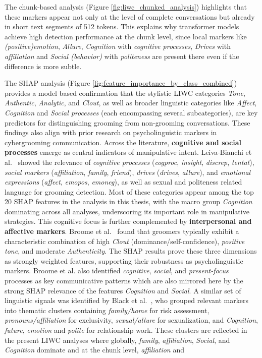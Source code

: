 The chunk-based analysis (Figure \ref{fig:liwc_chunked_analysis}) highlights that these markers appear not only at the level of complete conversations but already in short text segments of 512 tokens. This explains why transformer models achieve high detection performance at the chunk level, since local markers like \textit{(positive)emotion}, \textit{Allure}, \textit{Cognition} with \textit{cognitive processes}, \textit{Drives} with \textit{affiliation} and \textit{Social (behavior)} with \textit{politeness} are present there even if the difference is more subtle.


The SHAP analysis (Figure \ref{fig:feature_importance_by_class_combined}) provides a model based confirmation that the stylistic LIWC categories \textit{Tone}, \textit{Authentic}, \textit{Analytic}, and \textit{Clout}, as well as broader linguistic categories like  \textit{Affect}, \textit{Cognition} and \textit{Social processes} (each encompassing several subcategories), are key predictors for distinguishing grooming from non-grooming conversations. These findings also align with prior research on psycholinguistic markers in cybergrooming communication. Across the literature, \textbf{cognitive and social processes} emerge as central indicators of manipulative intent. Leiva-Bianchi et al.~\cite{leiva2024meta} showed the relevance of \textit{cognitive processes} (\textit{cogproc}, \textit{insight}, \textit{discrep}, \textit{tentat}), \textit{social markers} (\textit{affiliation}, \textit{family}, \textit{friend}), \textit{drives} (\textit{drives}, \textit{allure}), and \textit{emotional expressions} (\textit{affect}, \textit{emopos}, \textit{emoneg}), as well as sexual and politeness related language for grooming detection. Most of these categories appear among the top 20 SHAP features in the analysis in this thesis, with the macro group \textit{Cognition} dominating across all analyses, underscoring its important role in manipulative strategies. This cognitive focus is further complemented by \textbf{interpersonal and affective markers}. Broome et al.~\cite{broome2020psycholinguistic} found that groomers typically exhibit a characteristic combination of high \textit{Clout} (dominance/self-confidence), \textit{positive tone}, and moderate \textit{Authenticity}. The SHAP results prove these three dimensions as strongly weighted features, supporting their robustness as psycholinguistic markers. Broome et al. also identified \textit{cognitive}, \textit{social}, and \textit{present-focus} processes as key communicative patterns which are also mirrored here by the strong SHAP relevance of the features \textit{Cognition} and \textit{Social}. A similar set of linguistic signals was identified by Black et al.~\cite{black2015linguistic}, who grouped relevant markers into thematic clusters containing \textit{family/home} for risk assessment, \textit{pronouns/affiliation} for exclusivity, \textit{sexual/allure} for sexualization, and \textit{Cognition}, \textit{future}, \textit{emotion} and \textit{polite} for relationship work. These clusters are reflected in the present LIWC analyses where globally, \textit{family}, \textit{affiliation}, \textit{Social}, and \textit{Cognition} dominate and at the chunk level, \textit{affiliation} and 